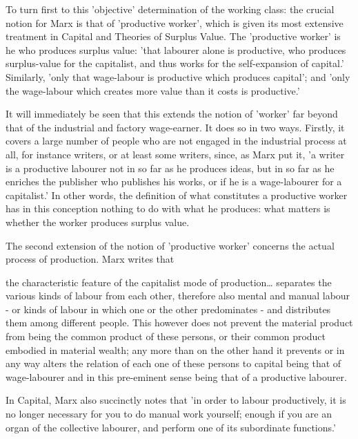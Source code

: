 To turn first to this 'objective' determination of the working class: the crucial notion for Marx is that of 'productive worker', which is given its most extensive treatment in Capital and Theories of Surplus Value. The 'productive worker' is he who produces surplus value: 'that labourer alone is productive, who produces surplus-value for the capitalist, and thus works for the self-expansion of capital.' Similarly, 'only that wage-labour is productive which produces capital'; and 'only the wage-labour which creates more value than it costs is productive.'

It will immediately be seen that this extends the notion of 'worker' far beyond that of the industrial and factory wage\hyp{}earner. It does so in two ways. Firstly, it covers a large number of people who are not engaged in the industrial process at all, for instance writers, or at least some writers, since, as Marx put it, 'a writer is a productive labourer not in so far as he produces ideas, but in so far as he enriches the publisher who publishes his works, or if he is a wage-labourer for a capitalist.' In other words, the definition of what constitutes a productive worker has in this conception nothing to do with what he produces: what matters is whether the worker produces surplus value.

The second extension of the notion of 'productive worker' concerns the actual process of production. Marx writes that

\begin{displayquote}
    the characteristic feature of the capitalist mode of production\dots{} separates the various kinds of labour from each other, therefore also mental and manual labour - or kinds of labour in which one or the other predominates - and distributes them among different people. This however does not prevent the material product from being the common product of these persons, or their common product embodied in material wealth; any more than on the other hand it prevents or in any way alters the relation of each one of these persons to capital being that of wage-labourer and in this pre-eminent sense being that of a productive labourer.
\end{displayquote}

In Capital, Marx also succinctly notes that 'in order to labour productively, it is no longer necessary for you to do manual work yourself; enough if you are an organ of the collective labourer, and perform one of its subordinate functions.'

